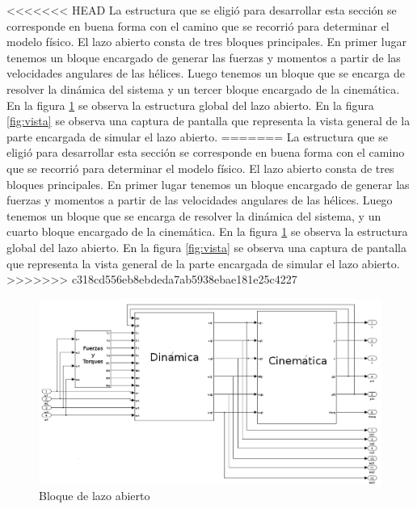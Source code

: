 \documentclass[main]{subfiles}
\begin{document}
<<<<<<< HEAD
La estructura que se eligi\'o para desarrollar esta secci\'on se corresponde en buena forma con el camino que se recorri\'o para determinar el modelo f\'isico. El lazo abierto consta de tres bloques principales. En primer lugar tenemos un bloque encargado de generar las fuerzas y momentos a partir de las velocidades angulares de las h\'elices. Luego tenemos un bloque que se encarga de resolver la din\'amica del sistema y un tercer bloque encargado de la cinem\'atica. En la figura \ref{fig:lazo_abierto} se observa la estructura global del lazo abierto. En la figura \ref{fig:vista} se observa una captura de pantalla que representa la vista general de la parte encargada de simular el lazo abierto.
=======
La estructura que se eligi\'o para desarrollar esta secci\'on se corresponde en buena forma con el camino que se recorri\'o para determinar el modelo f\'isico. El lazo abierto consta de tres bloques principales. En primer lugar tenemos un bloque encargado de generar las fuerzas y momentos a partir de las velocidades angulares de las h\'elices. Luego tenemos un bloque que se encarga de resolver la din\'amica del sistema, y un cuarto bloque encargado de la cinem\'atica. En la figura \ref{fig:lazo_abierto} se observa la estructura global del lazo abierto. En la figura \ref{fig:vista} se observa una captura de pantalla que representa la vista general de la parte encargada de simular el lazo abierto.
>>>>>>> c318cd556eb8ebdeda7ab5938ebae181e25c4227
\begin{figure}[h!]
	\centering
	\includegraphics[width=1\textwidth]{./pics_simulador/lazo_abierto.pdf}
	\caption{Bloque de lazo abierto}
	\label{fig:lazo_abierto}
\end{figure}
\end{document}
